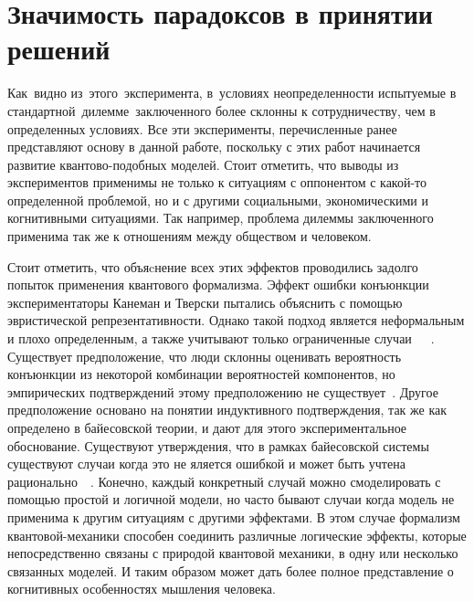 \section{Значимость парадоксов в принятии решений}

Как~видно из~этого~эксперимента, в~условиях неопределенности испытуемые в стандартной~дилемме~заключенного
более склонны к сотрудничеству, чем в определенных условиях. Все эти эксперименты, перечисленные ранее
представляют основу в данной работе, поскольку с этих работ начинается развитие квантово-подобных моделей.
Стоит отметить, что выводы из экспериментов применимы не только к ситуациям с оппонентом с какой-то
определенной проблемой, но и с другими социальными, экономическими и когнитивными ситуациями. Так например,
проблема дилеммы заключенного применима так же к отношениям между обществом и человеком.

Стоит отметить, что объяcнение всех этих эффектов проводились задолго попыток применения квантового формализма.
Эффект ошибки конъюнкции экспериментаторы Канеман и Тверски пытались объяснить с помощью эвристической
репрезентативности. Однако такой подход является неформальным и плохо определенным, а также учитывают
только ограниченные случаи~\citep{shafffi1990typicality}~\citep{massaro1994pattern}~\citep{gigerenzer1996narrow}.
Существует предположение, что люди склонны оценивать вероятность конъюнкции из некоторой комбинации
вероятностей компонентов, но эмпирических подтверждений этому предположению не существует~\citep{tentori2013determinants}.
Другое предположение основано на понятии индуктивного подтверждения, так же как определено в байесовской
теории, и дают для этого экспериментальное обоснование. Существуют утверждения, что в рамках байесовской
системы существуют случаи когда это не яляется ошибкой и может быть учтена рационально~\citep{von2011bayesian}~\citep{hintikka2004fallacious}.
Конечно, каждый конкретный случай можно смоделировать с помощью простой и логичной модели, но часто
бывают случаи когда модель не применима к другим ситуациям с другими эффектами. В этом случае формализм
квантовой-механики способен соединить различные логические эффекты, которые непосредственно связаны с природой
квантовой механики, в одну или несколько связанных моделей. И таким образом может дать более полное
представление о когнитивных особенностях мышления человека.